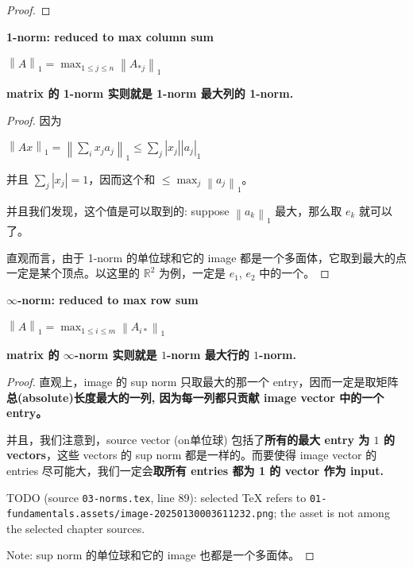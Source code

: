 \begin{example}
\begin{proof}
\end{proof}

\begin{proposition}{\textbf{1-norm: reduced to max column sum}}

\(\left\| A \right\|_{1} = \max_{1 \leq j \leq n}\left\| A_{\ast j} \right\|_{1}\)

\textbf{matrix 的 1-norm 实则就是 1-norm 最大列的 1-norm.}

\end{proposition}

\begin{proof}

因为

\(\left\| {Ax} \right\|_{1} = \left\| {\sum_{i}x_{j}a_{j}} \right\|_{1} \leq \sum_{j}\left| x_{j} \right|\left| a_{j} \right|_{1}\)

并且 \(\sum_{j}\left| x_{j} \right| = 1\)，因而这个和 \(\leq \max_{j}\left\| a_{j} \right\|_{1}\)。

并且我们发现，这个值是可以取到的: suppose \(\left\| a_{k} \right\|_{1}\) 最大，那么取 \(e_{k}\) 就可以了。

直观而言，由于 1-norm 的单位球和它的 image 都是一个多面体，它取到最大的点一定是某个顶点。以这里的 \(\mathbb{R}^{2}\) 为例，一定是 \(e_{1}\), \(e_{2}\) 中的一个。

\end{proof}

\begin{proposition}{\textbf{\(\infty\)-norm: reduced to max row sum}}

\(\left\| A \right\|_{1} = \max_{1 \leq i \leq m}\left\| A_{i \ast} \right\|_{1}\)

\textbf{matrix 的 \(\infty\)-norm 实则就是 \(1\)-norm 最大行的 \(1\)-norm.}

\end{proposition}

\begin{proof}

直观上，image 的 sup norm 只取最大的那一个 entry，因而一定是取矩阵\textbf{总(absolute)长度最大的一列, 因为每一列都只贡献 image vector 中的一个 entry。}

并且，我们注意到，source vector (on单位球) 包括了\textbf{所有的最大 entry 为 \(1\) 的 vectors}，这些 vectors 的 sup norm 都是一样的。而要使得 image vector 的 entries 尽可能大，我们一定会\textbf{取所有 entries 都为 1 的 vector 作为 input.}

TODO (source \texttt{03-norms.tex}, line 89): selected TeX refers to \texttt{01-fundamentals.assets/image-20250130003611232.png}; the asset is not among the selected chapter sources.

Note: sup norm 的单位球和它的 image 也都是一个多面体。

\end{proof}

\end{example}

